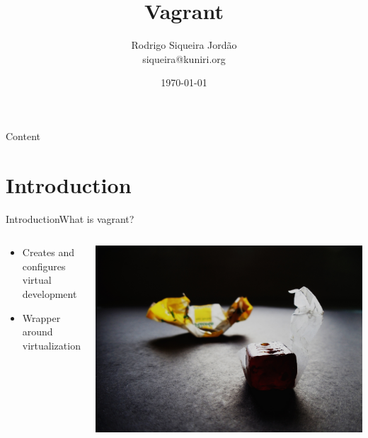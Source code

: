 \documentclass[10pt]{beamer}
\title[] %
{ %
      \textbf{Vagrant}
}
\subtitle[Vagrant]
{
}
\author[Rodrigo Siqueira Jordão]
{      Rodrigo Siqueira Jordão \\
      {\ttfamily siqueira@kuniri.org}
}
\institute[]
{
      Institute of Mathematics and Statistics\\
      University of Sao Paulo\\

}
\date{\today}
\begin{document}

{\1%
\begin{frame}
  \titlepage %
\end{frame}}

\begin{frame}[shrink]{Content}{}
  \tableofcontents
\end{frame}

\section{Introduction}
\begin{frame}{Introduction}{What is vagrant?}
  \begin{columns}[T]

    \begin{column}{.6\textwidth}
      \begin{itemize}
        \item Creates and configures virtual development
        \item Wrapper around virtualization
      \end{itemize}
    \end{column}

    \hfill

    \begin{column}{.4\textwidth}
      \centering
      \includegraphics[width=1\textwidth, keepaspectratio=true]{images/wrapper.jpg}
    \end{column}
  \end{columns}
\end{frame}
\end{document}
